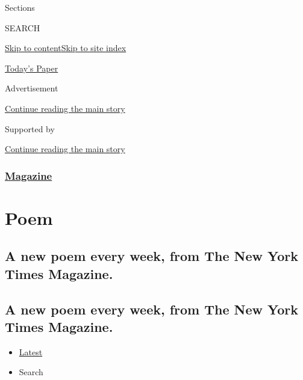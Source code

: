 Sections

SEARCH

\protect\hyperlink{site-content}{Skip to
content}\protect\hyperlink{site-index}{Skip to site index}

\href{https://myaccount.nytimes3xbfgragh.onion/auth/login?response_type=cookie\&client_id=vi}{}

\href{https://www.nytimes3xbfgragh.onion/section/todayspaper}{Today's
Paper}

Advertisement

\protect\hyperlink{after-top}{Continue reading the main story}

Supported by

\protect\hyperlink{after-sponsor}{Continue reading the main story}

\hypertarget{magazine}{%
\subsubsection{\texorpdfstring{\href{/section/magazine}{Magazine}}{Magazine}}\label{magazine}}

\hypertarget{poem}{%
\section{Poem}\label{poem}}

\hypertarget{a-new-poem-every-week-from-the-new-york-times-magazine}{%
\subsection{A new poem every week, from The New York Times
Magazine.}\label{a-new-poem-every-week-from-the-new-york-times-magazine}}

\hypertarget{a-new-poem-every-week-from-the-new-york-times-magazine-1}{%
\subsection{A new poem every week, from The New York Times
Magazine.}\label{a-new-poem-every-week-from-the-new-york-times-magazine-1}}

\begin{itemize}
\tightlist
\item
  \protect\hyperlink{stream-panel}{Latest}
\item
  Search
\end{itemize}

